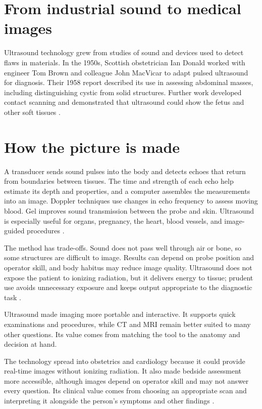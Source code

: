 \documentclass[12pt,oneside]{book}
\begin{document}
\section{From industrial sound to medical images}
Ultrasound technology grew from studies of sound and devices used to
detect flaws in materials. In the 1950s, Scottish obstetrician Ian Donald
worked with engineer Tom Brown and colleague John MacVicar to adapt pulsed
ultrasound for diagnosis. Their 1958 report described its use in assessing
abdominal masses, including distinguishing cystic from solid structures.
Further work developed contact scanning and demonstrated that ultrasound
could show the fetus and other soft tissues \cite{donaldUltrasound1958,sonographyHistory}.

\section{How the picture is made}
A transducer sends sound pulses into the body and detects echoes that
return from boundaries between tissues. The time and strength of each echo
help estimate its depth and properties, and a computer assembles the
measurements into an image. Doppler techniques use changes in echo
frequency to assess moving blood. Gel improves sound transmission between
the probe and skin. Ultrasound is especially useful for organs, pregnancy,
the heart, blood vessels, and image-guided procedures
\cite{fdaUltrasound}.

The method has trade-offs. Sound does not pass well through air or bone,
so some structures are difficult to image. Results can depend on probe
position and operator skill, and body habitus may reduce image quality.
Ultrasound does not expose the patient to ionizing radiation, but it
delivers energy to tissue; prudent use avoids unnecessary exposure and
keeps output appropriate to the diagnostic task \cite{fdaUltrasound}.

Ultrasound made imaging more portable and interactive. It supports quick
examinations and procedures, while CT and MRI remain better suited to many
other questions. Its value comes from matching the tool to the anatomy
and decision at hand.

The technology spread into obstetrics and cardiology because it could provide
real-time images without ionizing radiation. It also made bedside assessment
more accessible, although images depend on operator skill and may not answer
every question. Its clinical value comes from choosing an appropriate scan and
interpreting it alongside the person’s symptoms and other findings
\cite{sonographyHistory,fdaUltrasound}.
\end{document}
